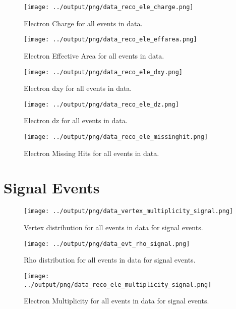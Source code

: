 \documentclass[11pt]{book}
\begin{document}
\begin{figure}[htb]
\centering
\texttt{[image: ../output/png/data\_reco\_ele\_charge.png]}
\caption{Electron Charge for all events in data.}
\label{fig:data_ele_charge}
\end{figure}

\begin{figure}[htb]
\centering
\texttt{[image: ../output/png/data\_reco\_ele\_effarea.png]}
\caption{Electron Effective Area for all events in data.}
\label{fig:data_ele_effarea}
\end{figure}

\begin{figure}[htb]
\centering
\texttt{[image: ../output/png/data\_reco\_ele\_dxy.png]}
\caption{Electron dxy for all events in data.}
\label{fig:data_ele_dxy}
\end{figure}

\begin{figure}[htb]
\centering
\texttt{[image: ../output/png/data\_reco\_ele\_dz.png]}
\caption{Electron dz for all events in data.}
\label{fig:data_ele_dz}
\end{figure}

\begin{figure}[htb]
\centering
\texttt{[image: ../output/png/data\_reco\_ele\_missinghit.png]}
\caption{Electron Missing Hits for all events in data.}
\label{fig:data_ele_missinghit}
\end{figure}
\clearpage




\section{Signal Events}
\begin{figure}[htb]
\centering
\texttt{[image: ../output/png/data\_vertex\_multiplicity\_signal.png]}
\caption{Vertex distribution for all events in data for signal events.}
\label{fig:data_vertex_multiplicity_signal}
\end{figure}

\begin{figure}[htb]
\centering
\texttt{[image: ../output/png/data\_evt\_rho\_signal.png]}
\caption{Rho distribution for all events in data for signal events.}
\label{fig:data_evt_rho_signal}
\end{figure}

\begin{figure}[htb]
\centering
\texttt{[image: ../output/png/data\_reco\_ele\_multiplicity\_signal.png]}
\caption{Electron Multiplicity for all events in data for signal events.}
\label{fig:data_ele_multiplicity_signal}
\end{figure}
\end{document}
